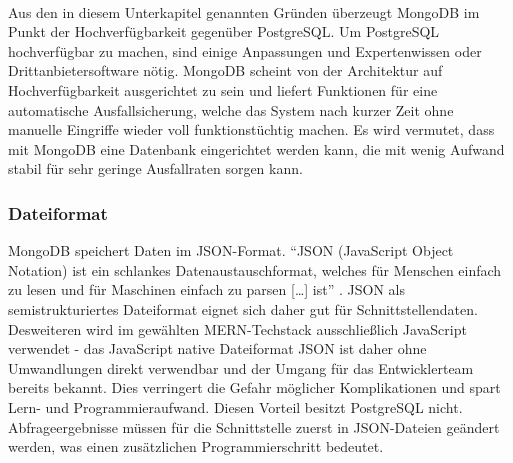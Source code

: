 \paragraph{}
Aus den in diesem Unterkapitel genannten Gründen überzeugt MongoDB im Punkt der Hochverfügbarkeit gegenüber PostgreSQL.
Um PostgreSQL hochverfügbar zu machen, sind einige Anpassungen und Expertenwissen oder Drittanbietersoftware nötig.
MongoDB scheint von der Architektur auf Hochverfügbarkeit ausgerichtet zu sein und liefert Funktionen für eine automatische Ausfallsicherung, welche das System nach kurzer Zeit ohne manuelle Eingriffe wieder voll funktionstüchtig machen.
Es wird vermutet, dass mit MongoDB eine Datenbank eingerichtet werden kann, die mit wenig Aufwand stabil für sehr geringe Ausfallraten sorgen kann.

\subsubsection{Dateiformat}
MongoDB speichert Daten im JSON-Format. 
\enquote{JSON (JavaScript Object Notation) ist ein schlankes Datenaustauschformat, welches für Menschen einfach zu lesen und für Maschinen einfach zu parsen [\dots] ist} \cite{db:json}. 
JSON als semistrukturiertes Dateiformat eignet sich daher gut für Schnittstellendaten.\\
Desweiteren wird im gewählten MERN-Techstack ausschließlich JavaScript verwendet - das JavaScript native Dateiformat JSON ist daher ohne Umwandlungen direkt verwendbar und der Umgang für das Entwicklerteam bereits bekannt.
Dies verringert die Gefahr möglicher Komplikationen und spart Lern- und Programmieraufwand.
Diesen Vorteil besitzt PostgreSQL nicht.
Abfrageergebnisse müssen für die Schnittstelle zuerst in JSON-Dateien geändert werden, was einen zusätzlichen Programmierschritt bedeutet.

